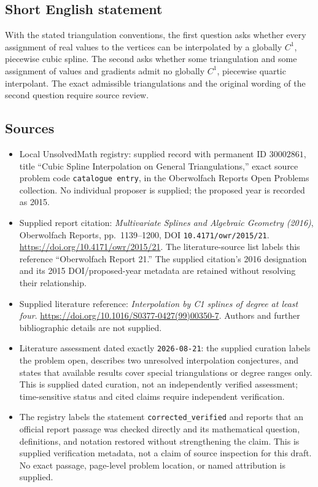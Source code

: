 \documentclass[11pt]{article}
\begin{document}
\subsection{Short English statement}
With the stated triangulation conventions, the first question asks whether every assignment of real values to the vertices can be interpolated by a globally \(C^1\), piecewise cubic spline. The second asks whether some triangulation and some assignment of values and gradients admit no globally \(C^1\), piecewise quartic interpolant. The exact admissible triangulations and the original wording of the second question require source review.
\subsection{Sources}
\begin{itemize}
\item Local UnsolvedMath registry: supplied record with permanent ID \(30002861\), title ``Cubic Spline Interpolation on General Triangulations,'' exact source problem code \texttt{catalogue entry}, in the Oberwolfach Reports Open Problems collection. No individual proposer is supplied; the proposed year is recorded as 2015.
\item Supplied report citation: \emph{Multivariate Splines and Algebraic Geometry (2016)}, Oberwolfach Reports, pp.\ 1139--1200, DOI \texttt{10.4171/owr/2015/21}. \url{https://doi.org/10.4171/owr/2015/21}. The literature-source list labels this reference ``Oberwolfach Report 21.'' The supplied citation's 2016 designation and its 2015 DOI/proposed-year metadata are retained without resolving their relationship.
\item Supplied literature reference: \emph{Interpolation by C1 splines of degree at least four}. \url{https://doi.org/10.1016/S0377-0427(99)00350-7}. Authors and further bibliographic details are not supplied.
\item Literature assessment dated exactly \texttt{2026-08-21}: the supplied curation labels the problem open, describes two unresolved interpolation conjectures, and states that available results cover special triangulations or degree ranges only. This is supplied dated curation, not an independently verified assessment; time-sensitive status and cited claims require independent verification.
\item The registry labels the statement \texttt{corrected\_verified} and reports that an official report passage was checked directly and its mathematical question, definitions, and notation restored without strengthening the claim. This is supplied verification metadata, not a claim of source inspection for this draft. No exact passage, page-level problem location, or named attribution is supplied.
\end{itemize}
\end{document}
